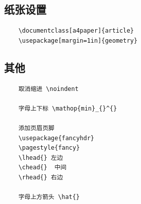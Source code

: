\documentclass[a4paper]{article}
\begin{document}
	\subsection{纸张设置}
	\begin{lstlisting}
	\documentclass[a4paper]{article}
	\usepackage[margin=1in]{geometry}
	\end{lstlisting}
	\subsection{其他}
	\begin{lstlisting}
	取消缩进 \noindent
	
	字母上下标 \mathop{min}_{}^{}
	
	添加页眉页脚
	\usepackage{fancyhdr}
	\pagestyle{fancy}
	\lhead{} 左边
	\chead{}  中间
	\rhead{} 右边
	
	字母上方箭头 \hat{}
	\end{lstlisting}
\end{document}
